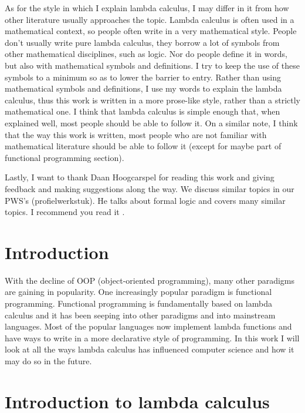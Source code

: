 \documentclass[11pt]{article}
\begin{document}
As for the style in which I explain lambda calculus, I may differ in it from
how other literature usually approaches the topic. Lambda calculus is often
used in a mathematical context, so people often write in a very mathematical
style. People don't usually write pure lambda calculus, they borrow a lot of
symbols from other mathematical disciplines, such as logic. Nor do people
define it in words, but also with mathematical symbols and definitions. I try
to keep the use of these symbols to a minimum so as to lower the barrier to
entry. Rather than using mathematical symbols and definitions, I use my words
to explain the lambda calculus, thus this work is written in a more prose-like
style, rather than a strictly mathematical one. I think that lambda calculus is
simple enough that, when explained well, most people should be able to follow
it. On a similar note, I think that the way this work is written, most people
who are not familiar with mathematical literature should be able to follow it
(except for maybe part of functional programming section).

Lastly, I want to thank Daan Hoogcarspel for reading this work and giving
feedback and making suggestions along the way. We discuss similar topics in our
PWS's (profielwerkstuk). He talks about formal logic and covers many similar
topics. I recommend you read it \parencite{daanbanaan}.

\newpage

\newpage
\thispagestyle{empty}
\mbox{}
\newpage

\tableofcontents
\newpage

\newpage
\thispagestyle{empty}
\mbox{}
\newpage


\section{Introduction}

With the decline of OOP (object-oriented programming), many other paradigms are
gaining in popularity. One increasingly popular paradigm is functional
programming. Functional programming is fundamentally based on lambda calculus
and it has been seeping into other paradigms and into mainstream languages.
Most of the popular languages now implement lambda functions and have ways to
write in a more declarative style of programming. In this work I will look at
all the ways lambda calculus has influenced computer science and how it may do
so in the future.

\section{Introduction to lambda calculus}
\end{document}
